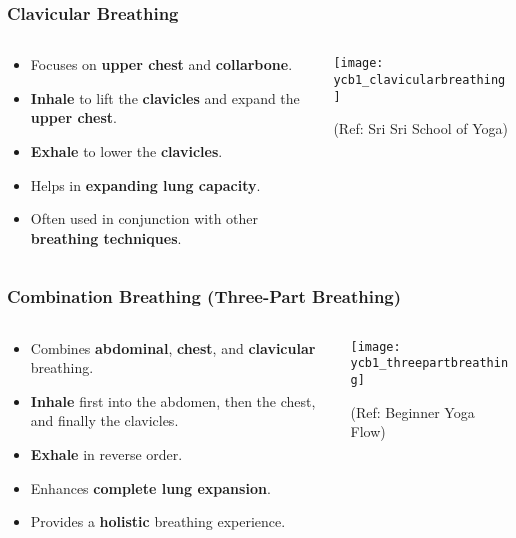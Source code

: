 \begin{frame}[fragile]\frametitle{Clavicular Breathing}
\begin{columns}
    \begin{column}[T]{0.5\linewidth}
      \begin{itemize}
        \item Focuses on \textbf{upper chest} and \textbf{collarbone}.
        \item \textbf{Inhale} to lift the \textbf{clavicles} and expand the \textbf{upper chest}.
        \item \textbf{Exhale} to lower the \textbf{clavicles}.
        \item Helps in \textbf{expanding lung capacity}.
        \item Often used in conjunction with other \textbf{breathing techniques}.
      \end{itemize}
    \end{column}
    \begin{column}[T]{0.5\linewidth}
        \begin{center}
        \texttt{[image: ycb1\_clavicularbreathing]}
				
		{\tiny (Ref: Sri Sri School of Yoga)}	  
        \end{center}	
    \end{column}
\end{columns}
\end{frame}

\begin{frame}[fragile]\frametitle{Combination Breathing (Three-Part Breathing)}
\begin{columns}
    \begin{column}[T]{0.5\linewidth}
      \begin{itemize}
        \item Combines \textbf{abdominal}, \textbf{chest}, and \textbf{clavicular} breathing.
        \item \textbf{Inhale} first into the abdomen, then the chest, and finally the clavicles.
        \item \textbf{Exhale} in reverse order.
        \item Enhances \textbf{complete lung expansion}.
        \item Provides a \textbf{holistic} breathing experience.
      \end{itemize}
    \end{column}
    \begin{column}[T]{0.5\linewidth}
        \begin{center}
        \texttt{[image: ycb1\_threepartbreathing]}
				
		{\tiny (Ref: Beginner Yoga Flow)}	  
        \end{center}	
    \end{column}
\end{columns}
\end{frame}



